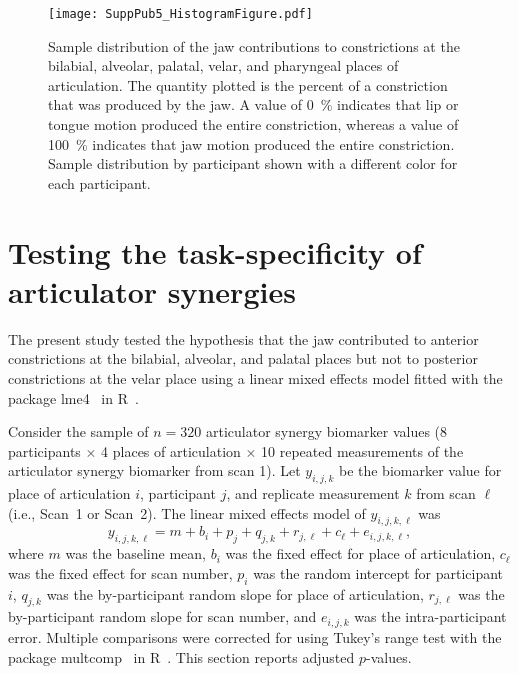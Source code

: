 \documentclass[reprint]{JASAnew}\usepackage[]{graphicx}\usepackage[]{color}
\begin{document}
\begin{figure*}

\texttt{[image: SuppPub5\_HistogramFigure.pdf]}

\caption{\label{fig:histograms}
Sample distribution of the jaw contributions to constrictions at the bilabial, alveolar, palatal, velar, and pharyngeal places of articulation. The quantity plotted is the percent of a constriction that was produced by the jaw.
A value of \SI{0}{\percent} indicates that lip or tongue motion produced the entire constriction, whereas a value of \SI{100}{\percent} indicates that jaw motion produced the entire constriction. 
Sample distribution by participant shown with a different color for each participant.}

\end{figure*}











\section{Testing the task-specificity of articulator synergies}
\label{sec:taskdependence}

The present study tested the hypothesis that the jaw contributed to anterior constrictions at the bilabial, alveolar, and palatal places but not to posterior constrictions at the velar place using a linear mixed effects model fitted with the package lme4~\citep{bates2015fitting} in R~\citep{r2017language}. 


Consider the sample of $n=320$ articulator synergy biomarker values (\num{8} participants $\times$ \num{4} places of articulation $\times$ \num{10} repeated measurements of the articulator synergy biomarker from scan \num{1}). Let $y_{i,j,k}$ be the biomarker value for place of articulation $i$, participant $j$, and replicate measurement $k$ from scan $\ell$ (i.e., Scan~\num{1} or Scan~\num{2}). The linear mixed effects model of $y_{i,j,k,\ell}$ was 
%
\begin{equation}
y_{i,j,k,\ell} = m + b_i + p_j + q_{j,k} + r_{j,\ell} + c_\ell + e_{i,j,k,\ell},
\end{equation}
%
where $m$ was the baseline mean, $b_i$ was the fixed effect for place of articulation, $c_\ell$ was the fixed effect for scan number, $p_i$ was the random intercept for participant $i$, $q_{j,k}$ was the by-participant random slope for place of articulation, $r_{j,\ell}$ was the by-participant random slope for scan number, and $e_{i,j,k}$ was the intra-participant error. Multiple comparisons were corrected for using Tukey's range test with the package multcomp~\citep{hothorn2008simultaneous} in R~\citep{r2017language}. This section reports adjusted $p$-values. 
\end{document}
